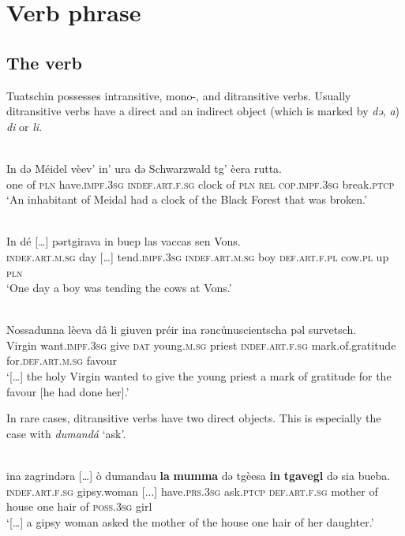 \chapter{Verb phrase}

\section{The verb}
Tuatschin possesses intransitive, mono-, and ditransitive verbs. Usually ditransitive verbs have a direct and an indirect object (which is marked by  \textit{də}, \textit{a}) \textit{di} or \textit{li}.

\ea\label{}
\\
\gll    In də Méidel vèev' in' ura də Schwarzwald tg' èera rutta.\\
     one of \textsc{pln} have.\textsc{impf.3sg} \textsc{indef.art.f.sg} clock of \textsc{pln} \textsc{rel} \textsc{cop.impf.3sg} break.\textsc{ptcp}\\
\glt `An inhabitant of Meidal had a clock of the Black Forest that was broken.'
\z

\ea\label{}
\\
\gll    In dé […] pərtgirava in buep las vaccas sen Vons.\\
     \textsc{indef.art.m.sg} day […] tend.\textsc{impf.3sg} \textsc{indef.art.m.sg} boy \textsc{def.art.f.pl} cow.\textsc{pl} up \textsc{pln}\\
\glt `One day a boy was tending the cows at Vons.'
\z

\ea\label{}
\\
\gll    […] Nossadunna lèeva dâ li giuven préir ina rǝncůnuscientscha pǝl survetsch.\\
   [...]  Virgin want.\textsc{impf.3sg} give \textsc{dat} young.\textsc{m.sg} priest \textsc{indef.art.f.sg} mark.of.gratitude for.\textsc{def.art.m.sg} favour \\
\glt `[…] the holy Virgin wanted to give the young priest a mark of gratitude for the favour [he had done her].'
\z

In rare cases, ditransitive verbs have two direct objects. This is especially the case with \textit{dumandá} `ask'.

\ea\label{}
 {\citealt[131]{Büchli1966}}\\
\gll  [...]  ina zagrindəra […] ò dumandau \textbf{la} \textbf{mumma} də tgèesa \textbf{in} \textbf{tgavegl} də sia bueba. \\
    [...] \textsc{indef.art.f.sg}   gipsy.woman [...] have.\textsc{prs.3sg}   ask.\textsc{ptcp} \textsc{def.art.f.sg} mother of house one hair of \textsc{poss.3sg} girl \\
\glt `[…] a gipsy woman asked the mother of the house one hair of her daughter.'
\z

